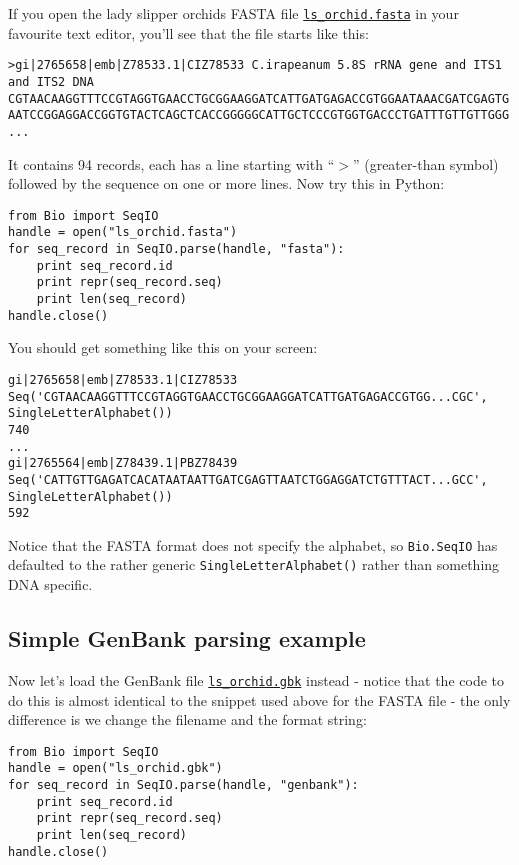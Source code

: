\documentclass{report}
\begin{document}
If you open the lady slipper orchids FASTA file \href{http://biopython.org/DIST/docs/tutorial/examples/ls_orchid.fasta}{\tt ls\_orchid.fasta} in your favourite text editor, you'll see that the file starts like this:

\begin{verbatim}
>gi|2765658|emb|Z78533.1|CIZ78533 C.irapeanum 5.8S rRNA gene and ITS1 and ITS2 DNA
CGTAACAAGGTTTCCGTAGGTGAACCTGCGGAAGGATCATTGATGAGACCGTGGAATAAACGATCGAGTG
AATCCGGAGGACCGGTGTACTCAGCTCACCGGGGGCATTGCTCCCGTGGTGACCCTGATTTGTTGTTGGG
...
\end{verbatim}

It contains 94 records, each has a line starting with ``$>$'' (greater-than symbol) followed by the sequence on one or more lines.  Now try this in Python:

\begin{verbatim}
from Bio import SeqIO
handle = open("ls_orchid.fasta")
for seq_record in SeqIO.parse(handle, "fasta"):
    print seq_record.id
    print repr(seq_record.seq)
    print len(seq_record)
handle.close()
\end{verbatim}

\noindent You should get something like this on your screen:

\begin{verbatim}
gi|2765658|emb|Z78533.1|CIZ78533
Seq('CGTAACAAGGTTTCCGTAGGTGAACCTGCGGAAGGATCATTGATGAGACCGTGG...CGC', SingleLetterAlphabet())
740
...
gi|2765564|emb|Z78439.1|PBZ78439
Seq('CATTGTTGAGATCACATAATAATTGATCGAGTTAATCTGGAGGATCTGTTTACT...GCC', SingleLetterAlphabet())
592
\end{verbatim}

Notice that the FASTA format does not specify the alphabet, so \verb|Bio.SeqIO| has defaulted to the rather generic \verb|SingleLetterAlphabet()| rather than something DNA specific.

\subsection{Simple GenBank parsing example}

Now let's load the GenBank file \href{http://biopython.org/DIST/docs/tutorial/examples/ls_orchid.gbk}{\tt ls\_orchid.gbk} instead - notice that the code to do this is almost identical to the snippet used above for the FASTA file - the only difference is we change the filename and the format string:

\begin{verbatim}
from Bio import SeqIO
handle = open("ls_orchid.gbk")
for seq_record in SeqIO.parse(handle, "genbank"):
    print seq_record.id
    print repr(seq_record.seq)
    print len(seq_record)
handle.close()
\end{verbatim}
\end{document}
